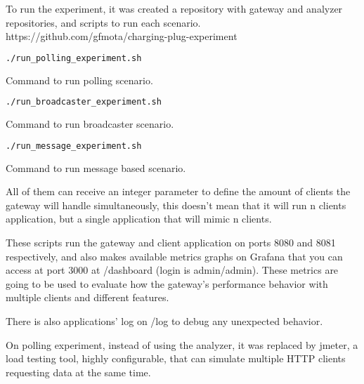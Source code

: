 To run the experiment, it was created a repository with gateway and analyzer repositories, and scripts to run each scenario. https://github.com/gfmota/charging-plug-experiment

\begin{program}
    \centering
  
  \begin{lstlisting}[language=bash, style=wider]
    ./run_polling_experiment.sh
  \end{lstlisting}
  
    \caption{Command to run polling scenario.\label{prog:java1}}
\end{program}

\begin{program}
    \centering
  
  \begin{lstlisting}[language=bash, style=wider]
    ./run_broadcaster_experiment.sh
  \end{lstlisting}
  
    \caption{Command to run broadcaster scenario.\label{prog:java2}}
\end{program}

\begin{program}
    \centering
  
  \begin{lstlisting}[language=bash, style=wider]
    ./run_message_experiment.sh
  \end{lstlisting}
  
    \caption{Command to run message based scenario.\label{prog:java3}}
\end{program}

All of them can receive an integer parameter to define the amount of clients the gateway will handle simultaneously, this doesn't mean that it will run n clients application, but a single application that will mimic n clients.

These scripts run the gateway and client application on ports 8080 and 8081 respectively, and also makes available metrics graphs on Grafana that you can access at port 3000 at /dashboard (login is admin/admin). These metrics are going to be used to evaluate how the gateway's performance behavior with multiple clients and different features.

There is also applications' log on /log to debug any unexpected behavior.

On polling experiment, instead of using the analyzer, it was replaced by jmeter, a load testing tool, highly configurable, that can simulate multiple HTTP clients requesting data at the same time.

